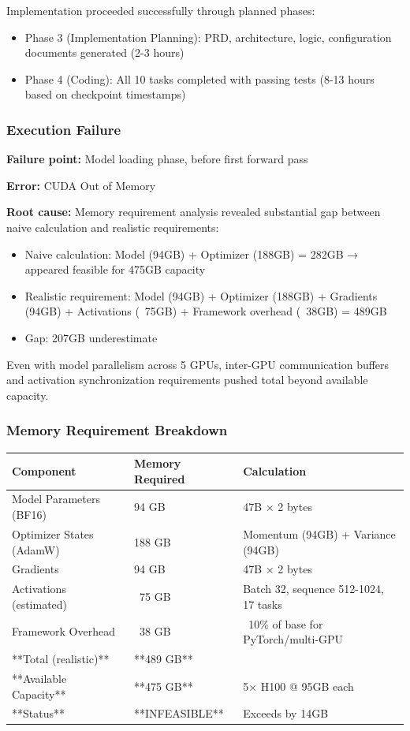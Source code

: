 Implementation proceeded successfully through planned phases:
\begin{itemize}
\item Phase 3 (Implementation Planning): PRD, architecture, logic, configuration documents generated (2-3 hours)
\item Phase 4 (Coding): All 10 tasks completed with passing tests (8-13 hours based on checkpoint timestamps)
\end{itemize}

\subsubsection{Execution Failure}

\textbf{Failure point:} Model loading phase, before first forward pass

\textbf{Error:} CUDA Out of Memory

\textbf{Root cause:} Memory requirement analysis revealed substantial gap between naive calculation and realistic requirements:

\begin{itemize}
\item Naive calculation: Model (94GB) + Optimizer (188GB) = 282GB → appeared feasible for 475GB capacity
\item Realistic requirement: Model (94GB) + Optimizer (188GB) + Gradients (94GB) + Activations (~75GB) + Framework overhead (~38GB) = 489GB
\item Gap: 207GB underestimate
\end{itemize}

Even with model parallelism across 5 GPUs, inter-GPU communication buffers and activation synchronization requirements pushed total beyond available capacity.

\subsubsection{Memory Requirement Breakdown}

\begin{table}[htbp]
\centering
\begin{tabular}{lll}
\toprule
Component & Memory Required & Calculation \\
\midrule
Model Parameters (BF16) & 94 GB & 47B × 2 bytes \\
Optimizer States (AdamW) & 188 GB & Momentum (94GB) + Variance (94GB) \\
Gradients & 94 GB & 47B × 2 bytes \\
Activations (estimated) & ~75 GB & Batch 32, sequence 512-1024, 17 tasks \\
Framework Overhead & ~38 GB & ~10\% of base for PyTorch/multi-GPU \\
**Total (realistic)** & **489 GB** &  \\
**Available Capacity** & **475 GB** & 5× H100 @ 95GB each \\
**Status** & **INFEASIBLE** & Exceeds by 14GB \\
\bottomrule
\end{tabular}
\end{table}

